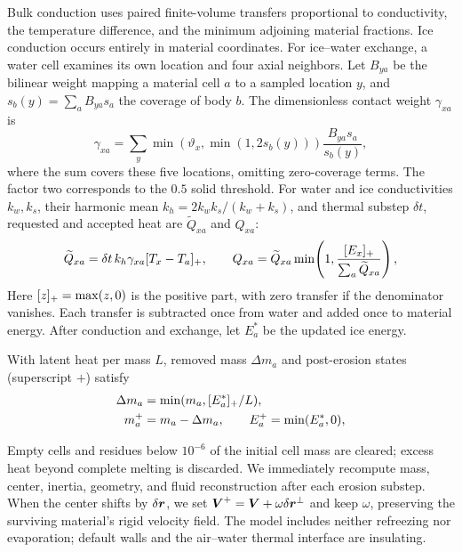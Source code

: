 Bulk conduction uses paired finite-volume transfers proportional to
conductivity, the temperature difference, and the minimum adjoining
material fractions. Ice conduction occurs entirely in material coordinates.
For ice--water exchange, a water cell examines its own location and four
axial neighbors. Let $B_{ya}$ be the bilinear weight mapping a material
cell $a$ to a sampled location $y$, and $s_b(y)=\sum_a B_{ya}s_a$ the
coverage of body $b$. The dimensionless contact weight $\gamma_{xa}$ is
\begin{equation}
      \gamma_{xa}=\sum_y
      \min\!\left(\vartheta_x,\min(1,2s_b(y))\right)
      \frac{B_{ya}s_a}{s_b(y)},
      \label{eq:contactheat}
\end{equation}
where the sum covers these five locations, omitting zero-coverage terms.
The factor two corresponds to the $0.5$ solid threshold. For water and ice
conductivities $k_w,k_s$, their harmonic mean $k_h=2k_wk_s/(k_w+k_s)$,
and thermal substep $\delta t$, requested and accepted heat are
$\widetilde Q_{xa}$ and $Q_{xa}$:
\begin{equation}
      \widetilde Q_{xa}=\delta t\,k_h\gamma_{xa}[T_x-T_a]_{+},
      \qquad Q_{xa}=\widetilde Q_{xa}
      \min\!\left(1,\frac{[E_x]_{+}}{\sum_a\widetilde Q_{xa}}\right),
      \label{eq:heat}
\end{equation}
Here $[z]_{+}=\max(z,0)$ is the positive part, with zero transfer if the
denominator vanishes.
Each transfer is subtracted once from water and added once to material
energy. After conduction and exchange, let $E_a^*$ be the updated ice
energy.

\begin{samepage}
      With latent heat per mass $L$, removed mass $\Delta m_a$ and
      post-erosion states (superscript $+$) satisfy
      \begin{equation}
            \begin{aligned}
                  \Delta m_a & =\min(m_a,[E_a^*]_{+}/L),                     \\
                  m_a^{+}    & =m_a-\Delta m_a,\qquad E_a^{+}=\min(E_a^*,0),
            \end{aligned}
            \label{eq:melt}
      \end{equation}
\end{samepage}
Empty cells and residues below $10^{-6}$ of
the initial cell mass are cleared; excess heat beyond complete melting
is discarded. We immediately recompute mass, center, inertia, geometry,
and fluid reconstruction after each erosion substep. When the center
shifts by $\delta\boldsymbol{r}$, we set
$\boldsymbol{V}^+=\boldsymbol{V}+\omega\delta\boldsymbol{r}^\perp$ and keep $\omega$, preserving
the surviving material's rigid velocity field. The model includes neither
refreezing nor evaporation; default walls and the air--water thermal
interface are insulating.

